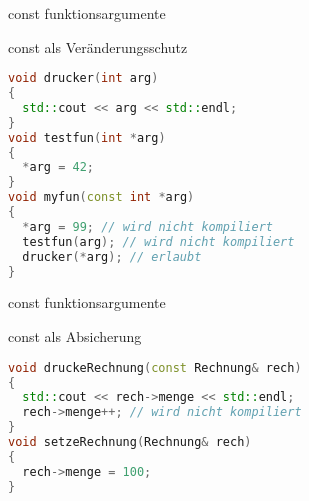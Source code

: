 \begin{frame}[fragile]{const funktionsargumente}

\begin{block}{const als Veränderungsschutz}
\begin{small}
	\begin{lstlisting}[language=C++]
void drucker(int arg)
{
  std::cout << arg << std::endl;
}
void testfun(int *arg)
{
  *arg = 42;
}
void myfun(const int *arg)
{
  *arg = 99; // wird nicht kompiliert
  testfun(arg); // wird nicht kompiliert
  drucker(*arg); // erlaubt
}
	\end{lstlisting}
	\end{small}
\end{block}

\end{frame}
\begin{frame}[fragile]{const funktionsargumente}

\begin{block}{const als Absicherung}
	\begin{lstlisting}[language=C++]
void druckeRechnung(const Rechnung& rech)
{
  std::cout << rech->menge << std::endl;
  rech->menge++; // wird nicht kompiliert
}
void setzeRechnung(Rechnung& rech)
{
  rech->menge = 100;
}
	\end{lstlisting}
\end{block}


\end{frame}
